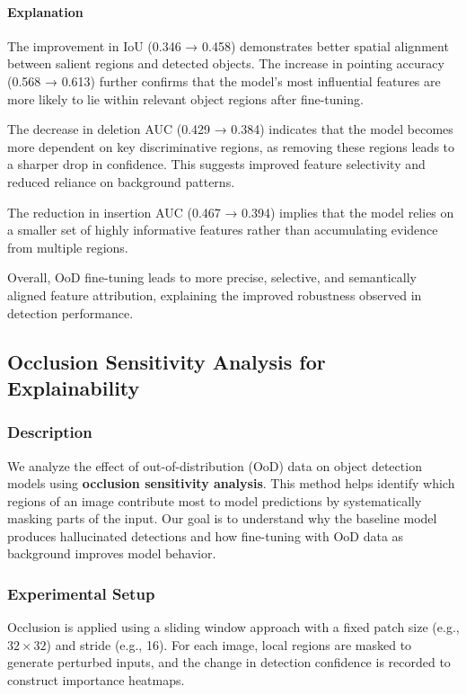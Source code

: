 \paragraph{Explanation}

The improvement in IoU (0.346 → 0.458) demonstrates better spatial alignment between salient regions and detected objects. The increase in pointing accuracy (0.568 → 0.613) further confirms that the model's most influential features are more likely to lie within relevant object regions after fine-tuning.

The decrease in deletion AUC (0.429 → 0.384) indicates that the model becomes more dependent on key discriminative regions, as removing these regions leads to a sharper drop in confidence. This suggests improved feature selectivity and reduced reliance on background patterns.

The reduction in insertion AUC (0.467 → 0.394) implies that the model relies on a smaller set of highly informative features rather than accumulating evidence from multiple regions.

Overall, OoD fine-tuning leads to more precise, selective, and semantically aligned feature attribution, explaining the improved robustness observed in detection performance.

\subsection{Occlusion Sensitivity Analysis for Explainability}

\subsubsection{Description}
We analyze the effect of out-of-distribution (OoD) data on object detection models using \textbf{occlusion sensitivity analysis}. This method helps identify which regions of an image contribute most to model predictions by systematically masking parts of the input. Our goal is to understand why the baseline model produces hallucinated detections and how fine-tuning with OoD data as background improves model behavior.

\subsubsection{Experimental Setup}
Occlusion is applied using a sliding window approach with a fixed patch size (e.g., $32 \times 32$) and stride (e.g., 16). For each image, local regions are masked to generate perturbed inputs, and the change in detection confidence is recorded to construct importance heatmaps.

